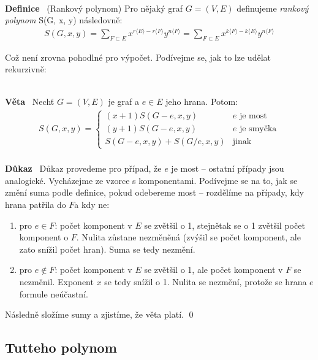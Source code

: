 \documentclass{article}
\renewcommand{\paragraph}[1]{\ \\\smallskip\noindent\textbf{#1}\ }
\begin{document}
\paragraph{Definice} (Rankový polynom)
Pro nějaký graf $G=(V,E)$ definujeme \textit{rankový polynom} S(G, x, y) 
následovně:
\begin{align}
	S(G, x, y ) = \sum_{F \subset E} x^{r\langle E\rangle - r\langle F \rangle} 
	y^{n\langle F\rangle} = \sum_{F \subset E} x^{k\langle F\rangle - k\langle E 
	\rangle} y^{n\langle F\rangle}
\end{align}

Což není zrovna pohodlné pro výpočet. Podívejme se, jak to lze udělat 
rekurzivně:

\paragraph{Věta} Nechť $G=(V,E)$ je graf a $e\in E$ jeho hrana. Potom:
\begin{align}
	S(G, x, y) = \left\{ \begin{array}{ll}
	(x+1) S(G - e, x, y) & e \text{ je most} \\
	(y+1) S(G - e, x, y) & e \text{ je smyčka}\\
	S(G-e, x, y) + S(G/e, x, y) & \text{jinak}
	\end{array}
	\right.
\end{align}
\paragraph{Důkaz}
Důkaz provedeme pro případ, že $e$ je most -- ostatní případy jsou analogické.  
Vycházejme ze vzorce s komponentami. Podívejme se na to, jak se změní suma podle 
definice, pokud odebereme most -- rozdělíme na případy, kdy hrana patřila do 
$F$a kdy ne:
\begin{enumerate}
	\item pro $e\in F$: počet komponent v $E$ se zvětšil o 1, stejnětak se o 1 
	zvětšil počet komponent o $F$. Nulita zůstane nezměněná (zvýšil se počet 
	komponent, ale zato snížil počet hran). Suma se tedy nezmění.
	\item pro $e \notin F$: počet komponent v $E$ se zvětšil o 1, ale počet 
	komponent v $F$ se nezměnil. Exponent $x$ se tedy snížil o 1. Nulita se 
	nezmění, protože se hrana $e$ formule neúčastní.
\end{enumerate}
Následně složíme sumy a zjistíme, že věta platí. \qed

\subsection{Tutteho polynom}
\end{document}
